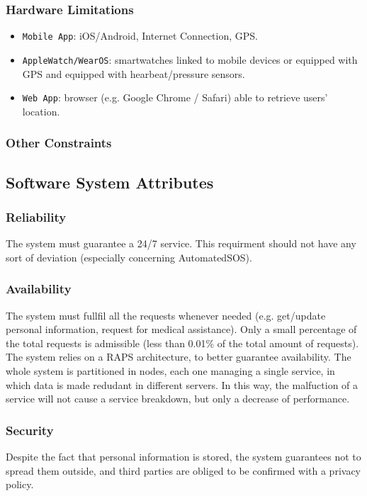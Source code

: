 \documentclass[12pt,a4paper]{article}
\begin{document}
	\subsubsection{Hardware Limitations}
		\begin{itemize}
			\item \texttt{Mobile App}: iOS/Android, Internet Connection, GPS.
			\item \texttt{AppleWatch/WearOS}: smartwatches linked to mobile devices or equipped with GPS and equipped with hearbeat/pressure sensors.
			\item \texttt{Web App}: browser (e.g. Google Chrome / Safari) able to retrieve users' location.
		\end{itemize}
	\subsubsection{Other Constraints}

	\subsection{Software System Attributes}
	\subsubsection{Reliability}
	The system must guarantee a 24/7 service. This requirment should not have any sort of deviation (especially concerning AutomatedSOS).
	\subsubsection{Availability}
	The system must fullfil all the requests whenever needed (e.g. get/update personal information, request for medical assistance). Only a small percentage of the total requests is admissible (less than 0.01\% of the total amount of requests). The system relies on a RAPS architecture, to better guarantee availability. The whole system is partitioned in nodes, each one managing a single service, in which data is made redudant in different servers. In this way, the malfuction of a service will not cause a service breakdown, but only a decrease of performance.
	\subsubsection{Security}
	Despite the fact that personal information is stored, the system guarantees not to spread them outside, and third parties are obliged to be confirmed with a privacy policy.
\end{document}
